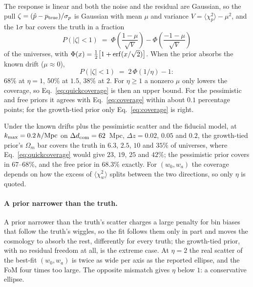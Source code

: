 The response is linear and both the noise and the residual are
Gaussian, so the pull $\zeta = (\hat{p} - p_{\rm true})/\sigma_p$ is
Gaussian with mean $\mu$ and variance
$V = \langle \chi^2_p \rangle - \mu^2$, and the $1\sigma$ bar covers the
truth in a fraction
\begin{equation}
  P(|\zeta| < 1) \;=\;
  \Phi\!\left(\frac{1 - \mu}{\sqrt{V}}\right)
  - \Phi\!\left(\frac{-1 - \mu}{\sqrt{V}}\right)
  \label{eq:coverage}
\end{equation}
of the universes, with
$\Phi(x) = \tfrac{1}{2}\bigl[1 + {\rm erf}(x/\sqrt{2})\bigr]$.  When the
prior absorbs the known drift ($\mu \approx 0$),
\begin{equation}
  P(|\zeta| < 1) \;=\; 2\,\Phi(1/\eta) - 1 :
  \label{eq:quickcoverage}
\end{equation}
$68\%$ at $\eta = 1$, $50\%$ at $1.5$, $38\%$ at $2$.  For
$\eta \geq 1$ a nonzero $\mu$ only lowers the coverage, so
Eq.~\eqref{eq:quickcoverage} is then an upper bound.  For the
pessimistic and free priors it agrees with Eq.~\eqref{eq:coverage}
within about $0.1$ percentage points;
for the growth-tied prior only Eq.~\eqref{eq:coverage} is right.

Under the known drifts plus the pessimistic scatter and the fiducial
model, at $k_{\rm max} = 0.2\,h/{\rm Mpc}$ on $\Delta d_{\rm com} = 62$~Mpc,
$\Delta z = 0.02$, $0.05$ and $0.2$, the growth-tied prior's
$\Omega_m$ bar covers the truth in $6.3$, $2.5$, $10$ and $35\%$ of
universes, where Eq.~\eqref{eq:quickcoverage} would give $23$, $19$,
$25$ and $42\%$; the pessimistic prior covers in $67$--$68\%$, and the
free prior in $68.3\%$ exactly.  For $(w_0, w_a)$ the coverage depends
on how the excess of $\langle \chi^2_w \rangle$ splits between the two
directions, so only $\eta$ is quoted.

\paragraph{A prior narrower than the truth.}
A prior narrower than the truth's scatter charges a large penalty for
bin biases that follow the truth's wiggles, so the fit follows them
only in part and moves the cosmology to absorb the rest, differently
for every truth; the growth-tied prior, with no residual freedom at
all, is the extreme case.  At
$\eta = 2$ the real scatter of the best-fit $(w_0, w_a)$ is twice as
wide per axis as the reported ellipse, and the FoM four times too
large.  The opposite mismatch gives $\eta$ below $1$: a conservative
ellipse.

